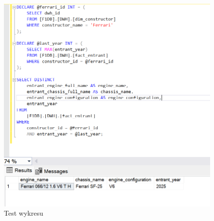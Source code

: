 \documentclass[12pt]{article}
\begin{document}
\begin{figure}[H]
    \centering   \includegraphics[width=\textwidth]{t16.png}
    \caption{Test wykresu}
\end{figure}
\end{document}
